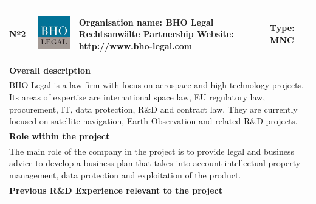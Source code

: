 \begin{longtable}[H]{|p{0.7cm}|p{4cm}|p{7cm}|p{1.3cm}|}
	\hline
	\begin{center} Nº2 \end{center} & \begin{center} \includegraphics[scale=0.4]{./logos/BHO-logo} \end{center} & \begin{center} \textbf{Organisation name:} BHO Legal Rechtsanwälte Partnership \newline \textbf{Website:} http://www.bho-legal.com \end{center} & \begin{center} Type: \newline MNC \end{center} \\ \hline
	
	\multicolumn{4}{|p{13cm}|}{\textbf{Overall description}}  \\ \hline
	
	\multicolumn{4}{|p{14.5cm}|}{BHO Legal is a law firm with focus on aerospace and high-technology projects. Its areas of expertise are international space law, EU regulatory law, procurement, IT, data protection, R\&D and contract law. They are currently focused on satellite navigation, Earth Observation and related R\&D projects.}  \\ \hline
	
	\multicolumn{4}{|p{13cm}|}{\textbf{Role within the project}}   \\ \hline
	
	\multicolumn{4}{|p{14.5cm}|}{The main role of the company in the project is to provide legal and business advice to develop a business plan that takes into account intellectual property management, data protection and exploitation of the product.}  \\ \hline
	
	\multicolumn{4}{|p{13cm}|}{\textbf{Previous R\&D Experience relevant to the project}}  \\ \hline
	

\end{longtable}
